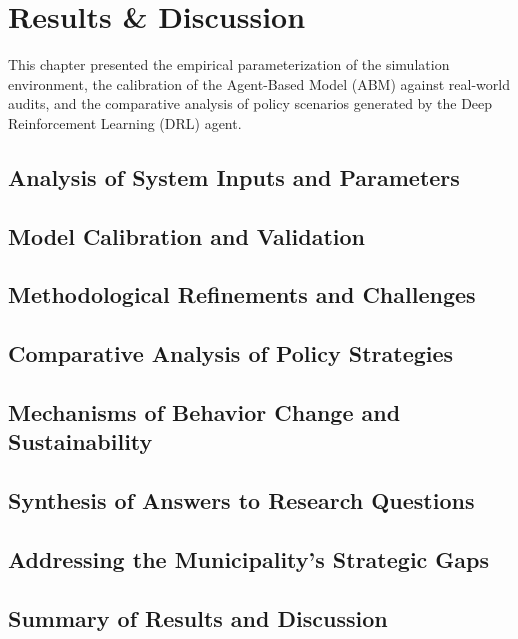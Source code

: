 \chapter{Results \& Discussion}
This chapter presented the empirical parameterization of the simulation environment, the calibration of the Agent-Based Model (ABM) against real-world audits, and the comparative analysis of policy scenarios generated by the Deep Reinforcement Learning (DRL) agent.

\section{Analysis of System Inputs and Parameters}



\section{Model Calibration and Validation}



\section{Methodological Refinements and Challenges}


\section{Comparative Analysis of Policy Strategies}



\section{Mechanisms of Behavior Change and Sustainability}



\section{Synthesis of Answers to Research Questions}



\section{Addressing the Municipality's Strategic Gaps}



\section{Summary of Results and Discussion}

